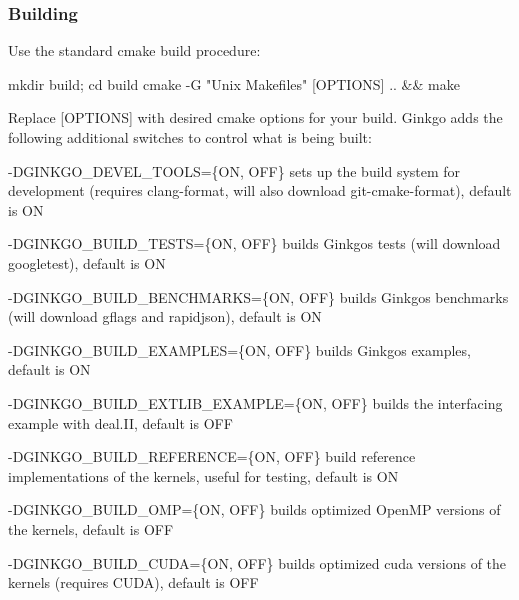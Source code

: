 \subsubsection*{Building}

Use the standard cmake build procedure\+:


\begin{DoxyCode}
mkdir build; cd build
cmake -G "Unix Makefiles" [OPTIONS] .. && make
\end{DoxyCode}
 Replace {\ttfamily \mbox{[}O\+P\+T\+I\+O\+NS\mbox{]}} with desired cmake options for your build. Ginkgo adds the following additional switches to control what is being built\+:


\begin{DoxyItemize}
\item {\ttfamily -\/\+D\+G\+I\+N\+K\+G\+O\+\_\+\+D\+E\+V\+E\+L\+\_\+\+T\+O\+O\+LS=\{ON, O\+FF\}} sets up the build system for development (requires clang-\/format, will also download git-\/cmake-\/format), default is {\ttfamily ON}
\item {\ttfamily -\/\+D\+G\+I\+N\+K\+G\+O\+\_\+\+B\+U\+I\+L\+D\+\_\+\+T\+E\+S\+TS=\{ON, O\+FF\}} builds Ginkgo\textquotesingle{}s tests (will download googletest), default is {\ttfamily ON}
\item {\ttfamily -\/\+D\+G\+I\+N\+K\+G\+O\+\_\+\+B\+U\+I\+L\+D\+\_\+\+B\+E\+N\+C\+H\+M\+A\+R\+KS=\{ON, O\+FF\}} builds Ginkgo\textquotesingle{}s benchmarks (will download gflags and rapidjson), default is {\ttfamily ON}
\item {\ttfamily -\/\+D\+G\+I\+N\+K\+G\+O\+\_\+\+B\+U\+I\+L\+D\+\_\+\+E\+X\+A\+M\+P\+L\+ES=\{ON, O\+FF\}} builds Ginkgo\textquotesingle{}s examples, default is {\ttfamily ON}
\item {\ttfamily -\/\+D\+G\+I\+N\+K\+G\+O\+\_\+\+B\+U\+I\+L\+D\+\_\+\+E\+X\+T\+L\+I\+B\+\_\+\+E\+X\+A\+M\+P\+LE=\{ON, O\+FF\}} builds the interfacing example with deal.\+II, default is {\ttfamily O\+FF}
\item {\ttfamily -\/\+D\+G\+I\+N\+K\+G\+O\+\_\+\+B\+U\+I\+L\+D\+\_\+\+R\+E\+F\+E\+R\+E\+N\+CE=\{ON, O\+FF\}} build reference implementations of the kernels, useful for testing, default is {\ttfamily ON}
\item {\ttfamily -\/\+D\+G\+I\+N\+K\+G\+O\+\_\+\+B\+U\+I\+L\+D\+\_\+\+O\+MP=\{ON, O\+FF\}} builds optimized Open\+MP versions of the kernels, default is {\ttfamily O\+FF}
\item {\ttfamily -\/\+D\+G\+I\+N\+K\+G\+O\+\_\+\+B\+U\+I\+L\+D\+\_\+\+C\+U\+DA=\{ON, O\+FF\}} builds optimized cuda versions of the kernels (requires C\+U\+DA), default is {\ttfamily O\+FF}

\end{DoxyItemize}
